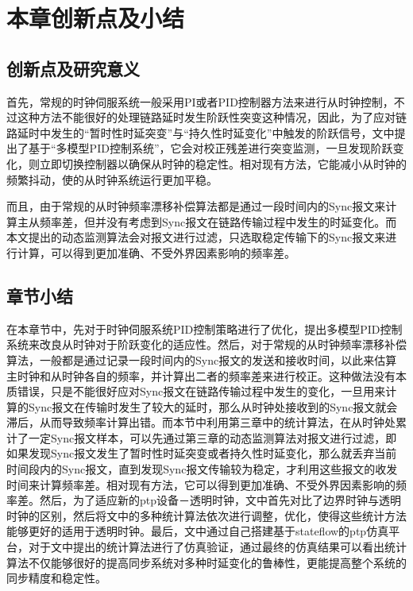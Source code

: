 \section{本章创新点及小结}
\subsection{创新点及研究意义}
首先，常规的时钟伺服系统一般采用PI或者PID控制器方法来进行从时钟控制，不过这种方法不能很好的处理链路延时发生阶跃性突变这种情况，因此，为了应对链路延时中发生的“暂时性时延突变”与“持久性时延变化”中触发的阶跃信号，文中提出了基于“多模型PID控制系统”，它会对校正残差进行突变监测，一旦发现阶跃变化，则立即切换控制器以确保从时钟的稳定性。相对现有方法，它能减小从时钟的频繁抖动，使的从时钟系统运行更加平稳。

而且，由于常规的从时钟频率漂移补偿算法都是通过一段时间内的Sync报文来计算主从频率差，但并没有考虑到Sync报文在链路传输过程中发生的时延变化。而本文提出的动态监测算法会对报文进行过滤，只选取稳定传输下的Sync报文来进行计算，可以得到更加准确、不受外界因素影响的频率差。

\subsection{章节小结}
在本章节中，先对于时钟伺服系统PID控制策略进行了优化，提出多模型PID控制系统来改良从时钟对于阶跃变化的适应性。然后，对于常规的从时钟频率漂移补偿算法，一般都是通过记录一段时间内的Sync报文的发送和接收时间，以此来估算主时钟和从时钟各自的频率，并计算出二者的频率差来进行校正。这种做法没有本质错误，只是不能很好应对Sync报文在链路传输过程中发生的变化，一旦用来计算的Sync报文在传输时发生了较大的延时，那么从时钟处接收到的Sync报文就会滞后，从而导致频率计算出错。而本节中利用第三章中的统计算法，在从时钟处累计了一定Sync报文样本，可以先通过第三章的动态监测算法对报文进行过滤，即如果发现Sync报文发生了暂时性时延突变或者持久性时延变化，那么就丢弃当前时间段内的Sync报文，直到发现Sync报文传输较为稳定，才利用这些报文的收发时间来计算频率差。相对现有方法，它可以得到更加准确、不受外界因素影响的频率差。然后，为了适应新的ptp设备－透明时钟，文中首先对比了边界时钟与透明时钟的区别，然后将文中的多种统计算法依次进行调整，优化，使得这些统计方法能够更好的适用于透明时钟。最后，文中通过自己搭建基于stateflow的ptp仿真平台，对于文中提出的统计算法进行了仿真验证，通过最终的仿真结果可以看出统计算法不仅能够很好的提高同步系统对多种时延变化的鲁棒性，更能提高整个系统的同步精度和稳定性。



